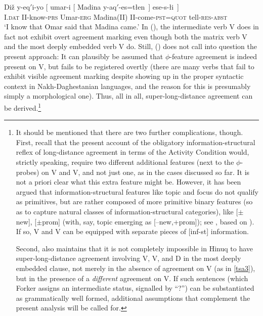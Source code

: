 \documentclass[output=paper
,modfonts
,nonflat]{langsci/langscibook}
\begin{document}
	\ea\label{ex:mueller:36} 
	\gll Di\v{z} \label{tsa3}y-eq$'$i-yo [ \textglotstop umar-i [ Madina  y-aq$'$-es=t\l en~] ese-s-\l i~]\\
	I.{\scshape dat} II-know-{\scshape prs} {} Umar-{\scshape erg} {} Madina(II) II-come-{\scshape pst}={\scshape quot} tell-{\scshape res}-{\scshape abst}\\
	\glt `I know that Omar said that Madina came.'
	\z
	In (\Last), the intermediate verb V does in fact not exhibit overt
	agreement marking even though both the matrix verb V and the most
	deeply embedded verb V do. Still, (\Last) does not call into question
	the present approach: It can plausibly be assumed that $\phi$-feature
	agreement is indeed present on V, but fails to be registered overtly
	(there are many verbs that fail to exhibit visible agreement marking
	despite showing up in the proper syntactic context in
	Nakh-Daghestanian languages, and the reason for this is presumably
	simply a morphological one). Thus, all in all, super-long-distance
	agreement can be derived.\footnote{It should be mentioned that there
		are two further complications, though. First, recall that the
		present account of the obligatory information-structural reflex of
		long-distance agreement in terms of the Activity Condition would,
		strictly speaking, require two different additional features (next
		to the $\phi$-probes) on V and V, and not just one, as in the
		cases discussed so far. It is not a priori clear what
		this extra feature might be. However, it has been argued that
		information-structural features like topic and focus do not qualify
		as primitives, but are rather composed of more primitive binary
		features (so as to capture natural classes of information-structural
		categories), like [$\pm$new], [$\pm$prom] (with, say, topic emerging
		as [--new,+prom]); see \citet{Choi:99}, based on
		\citet{Vallduvi:92}). If so, V and V can be equipped with
		separate pieces of [inf-st] information.
		
		Second, \citet{Forker:11} also maintains that it is not completely
		impossible in Hinuq to have super-long-distance agreement involving
		V, V, and D in the most deeply embedded clause, not merely
		in the absence of agreement on V (as in \ref{tsa3}), but in the presence of a {\it
			different} agreement on V.  If such sentences (which  Forker assigns
		an intermediate status, signalled by ``?'') can be substantiated as
		grammatically well formed, additional assumptions that complement the
		present analysis will be called for.}
	
\end{document}
